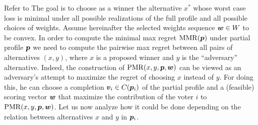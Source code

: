 Refer to \citep{Lu2011}
The goal is to choose as a winner the alternative $x^*$ whose worst case loss is minimal under all possible realizations of the full profile and all possible choices of weights. 
Assume hereinafter the selected weights sequence $\bm{w} \in W$ to be convex. 
In order to compute the minimal max regret $\operatorname{MMR}({\bm{p}})$ under partial profile ${\bm{p}}$ we need to compute the pairwise max regret between all pairs of alternatives $(x,y)$, where $x$ is a proposed winner and $y$ is the ``adversary'' alternative. Indeed, the construction of $\operatorname{PMR}(x,y,{\bm{p}},\bm{w})$ can be viewed as an adversary's attempt to maximize the regret of choosing $x$ instead of $y$. 
For doing this, he can choose a completion $\bm{v}_i \in C({\bm{p}}_i)$ of the partial profile and a (feasible) scoring vector $\bm{w}$ that maximize the contribution of the voter $i$ to $\operatorname{PMR}(x,y,{\bm{p}},\bm{w})$. Let us now analyze how it could be done depending on the relation between alternatives $x$ and $y$ in ${\bm{p}}_i$. 

